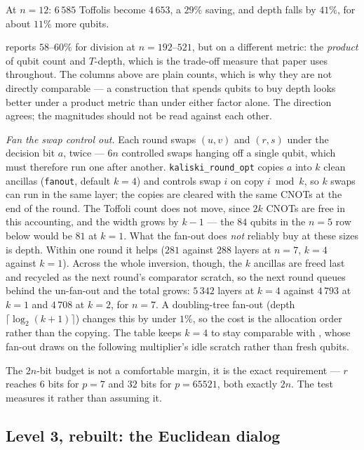 \documentclass[11pt]{article}
\newcommand{\code}[1]{\texttt{#1}}
\theoremstyle{plain}
\theoremstyle{remark}
\begin{document}
\noindent
At $n=12$: $6\,585$ Toffolis become $4\,653$, a $29\%$ saving, and depth falls
by $41\%$, for about $11\%$ more qubits.

\cite{ec:kim26} reports $58$--$60\%$ for division at $n=192$--$521$, but on a different metric:
the \emph{product} of qubit count and $T$-depth, which is the trade-off measure that paper uses
throughout. The columns above are plain counts, which is why they are not directly comparable ---
a construction that spends qubits to buy depth looks better under a product metric than under
either factor alone. The direction agrees; the magnitudes should not be read against each other.

\emph{Fan the swap control out.} Each round swaps $(u,v)$ and $(r,s)$ under the decision bit $a$,
twice --- $6n$ controlled swaps hanging off a single qubit, which must therefore run one after
another. \code{kaliski\_round\_opt} copies $a$ into $k$ clean ancillas (\code{fanout}, default
$k=4$) and controls swap $i$ on copy $i \bmod k$, so $k$ swaps can run in the same layer; the copies
are cleared with the same CNOTs at the end of the round. The Toffoli count does not move, since
$2k$ CNOTs are free in this accounting, and the width grows by $k-1$ --- the $84$ qubits in the
$n=5$ row below would be $81$ at $k=1$. What the
fan-out does \emph{not} reliably buy at these sizes is depth. Within one round it helps ($281$
against $288$ layers at $n=7$, $k=4$ against $k=1$). Across the whole inversion, though, the $k$ ancillas are freed
last and recycled as the next round's comparator scratch, so the next round queues behind the
un-fan-out and the total grows: $5\,342$ layers at $k=4$ against $4\,793$ at $k=1$ and $4\,708$ at
$k=2$, for $n=7$. A doubling-tree fan-out (depth $\lceil\log_2(k+1)\rceil$) changes this by under
$1\%$, so the cost is the allocation order rather than the copying. The table keeps $k=4$ to stay
comparable with \cite{ec:kim26}, whose fan-out draws on the following multiplier's idle scratch
rather than fresh qubits.

The $2n$-bit budget is not a comfortable margin, it is the exact requirement --- $r$ reaches $6$
bits for $p=7$ and $32$ bits for $p=65521$, both exactly $2n$. The test measures it rather than
assuming it.

\subsection{Level 3, rebuilt: the Euclidean dialog}\label{ec:sec:dialog}
\end{document}
